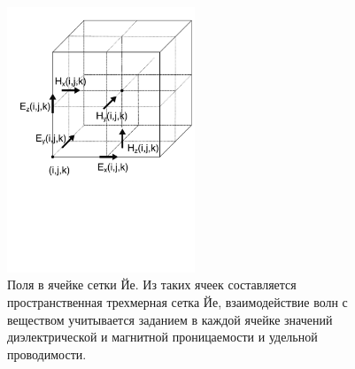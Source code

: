 \begin{figure}[p]
\centering
\includegraphics[width=0.5\textwidth]{graphics/Yee-Cubes}
\caption{Поля в ячейке сетки Йе.
    Из таких ячеек составляется пространственная трехмерная сетка Йе, взаимодействие
    волн с веществом учитывается заданием в каждой ячейке значений диэлектрической
    и магнитной проницаемости и удельной проводимости.}
\label{fig:YeeCell}
\end{figure}
